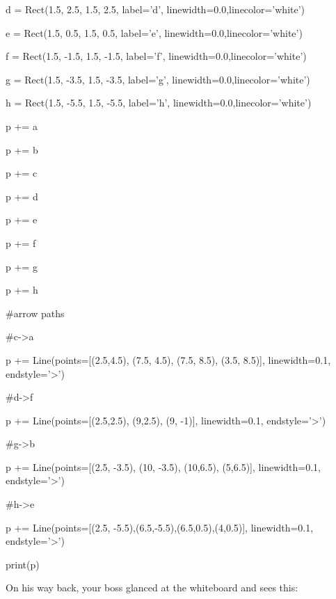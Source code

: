 \begin{python}
d = Rect(1.5, 2.5, 1.5, 2.5, label='d', linewidth=0.0,linecolor='white')

e = Rect(1.5, 0.5, 1.5, 0.5, label='e', linewidth=0.0,linecolor='white')

f = Rect(1.5, -1.5, 1.5, -1.5, label='f', linewidth=0.0,linecolor='white')

g = Rect(1.5, -3.5, 1.5, -3.5, label='g', linewidth=0.0,linecolor='white')

h = Rect(1.5, -5.5, 1.5, -5.5, label='h', linewidth=0.0,linecolor='white')



p += a

p += b

p += c

p += d

p += e

p += f

p += g

p += h



#arrow paths

#c->a

p += Line(points=[(2.5,4.5), (7.5, 4.5), (7.5, 8.5), (3.5, 8.5)], linewidth=0.1, endstyle='>')

#d->f

p += Line(points=[(2.5,2.5), (9,2.5), (9, -1)], linewidth=0.1, endstyle='>')

#g->b

p += Line(points=[(2.5, -3.5), (10, -3.5), (10,6.5), (5,6.5)], linewidth=0.1, endstyle='>')

#h->e

p += Line(points=[(2.5, -5.5),(6.5,-5.5),(6.5,0.5),(4,0.5)], linewidth=0.1, endstyle='>')



print(p)

\end{python}



On his way back, your boss glanced at the whiteboard and sees this:

